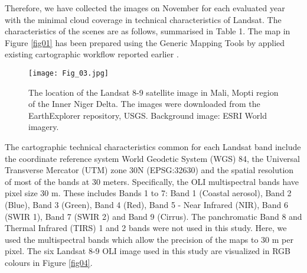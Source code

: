 \documentclass[12pt,a4paper,oneside]{article}
\def \newpar{\vspace{6pt}}
\begin{document}
\newpar Therefore, we have collected the images on November for each evaluated year with the minimal cloud coverage in technical characteristics of Landsat. The characteristics of the scenes are as follows, summarised in Table 1. The map in Figure \ref{fig01} has been prepared using the Generic Mapping Tools \citep{Wessel} by applied existing cartographic workflow reported earlier \citep{su142315966,LemenkovaDebeir2022JAES}. 

\begin{figure}[H]
\centering
	\texttt{[image: Fig\_03.jpg]}
	\vspace*{20pt}\caption{The location of the Landsat 8-9 satellite image in Mali, Mopti region of the Inner Niger Delta. The images were downloaded from the EarthExplorer repository, USGS. Background image: ESRI World imagery.
	\label{fig03}}
\end{figure}

\newpar The cartographic technical characteristics common for each Landsat band include the coordinate reference system World Geodetic System (WGS) 84, the Universal Transverse Mercator (UTM) zone 30N (EPSG:32630) and the spatial resolution of most of the bands at 30 meters. Specifically, the OLI multispectral bands have pixel size 30 m. These includes Bands 1 to 7: Band 1 (Coastal aerosol), Band 2 (Blue), Band 3 (Green), Band 4 (Red), Band 5 - Near Infrared (NIR), Band 6 (SWIR 1), Band 7 (SWIR 2) and Band 9 (Cirrus). The panchromatic Band 8 and Thermal Infrared (TIRS) 1 and 2 bands were not used in this study. Here, we used the multispectral bands which allow the precision of the maps to 30 m per pixel. The six Landsat 8-9 OLI image used in this study are visualized in RGB colours in Figure \ref{fig04}.
\end{document}
